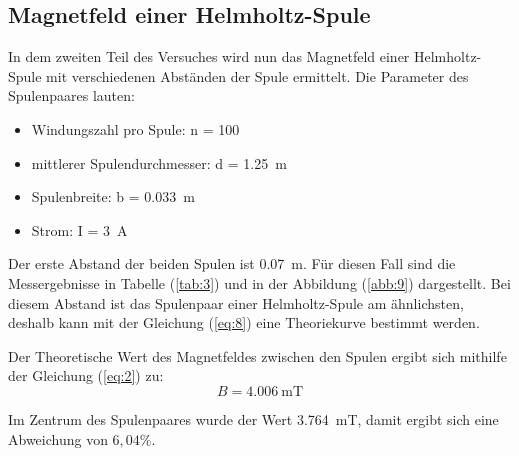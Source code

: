 \subsection{Magnetfeld einer Helmholtz-Spule}

In dem zweiten Teil des Versuches wird nun das Magnetfeld einer Helmholtz-Spule mit
verschiedenen Abständen der Spule ermittelt. Die Parameter des Spulenpaares lauten:

\begin{itemize}
  \item Windungszahl pro Spule: n = 100
  \item mittlerer Spulendurchmesser: d = \SI{1.25}{\meter}
  \item Spulenbreite: b = \SI{0.033}{\meter}
  \item Strom: I = \SI{3}{\ampere}
\end{itemize}

Der erste Abstand der beiden Spulen ist \SI{0.07}{\meter}. Für diesen Fall sind
die Messergebnisse in Tabelle (\ref{tab:3}) und in der Abbildung (\ref{abb:9})
dargestellt. Bei diesem Abstand ist das Spulenpaar einer Helmholtz-Spule am ähnlichsten,
deshalb kann mit der Gleichung (\ref{eq:8}) eine Theoriekurve bestimmt werden.

Der Theoretische Wert des Magnetfeldes zwischen den Spulen ergibt sich mithilfe der
Gleichung (\ref{eq:2}) zu:
\begin{equation*}
  B = \SI{4.006}{\milli\tesla}
\end{equation*}

Im Zentrum des Spulenpaares wurde der Wert \SI{3.764}{\milli\tesla}, damit ergibt sich eine
Abweichung von $6,04 \%$.

